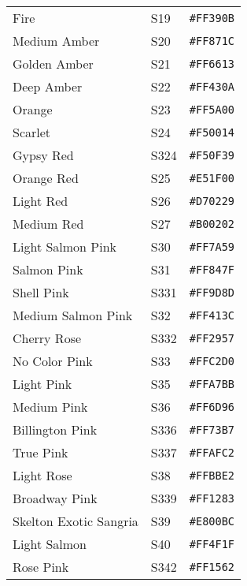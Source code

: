 \documentclass[a4paper]{article}
\begin{document}
\begin{longtable}{|l|l|r|}
Fire & S19 & \texttt{\#FF390B} \cellcolor[HTML]{FF390B} \\
Medium Amber & S20 & \texttt{\#FF871C} \cellcolor[HTML]{FF871C} \\
Golden Amber & S21 & \texttt{\#FF6613} \cellcolor[HTML]{FF6613} \\
Deep Amber & S22 & \texttt{\#FF430A} \cellcolor[HTML]{FF430A} \\
Orange & S23 & \texttt{\#FF5A00} \cellcolor[HTML]{FF5A00} \\
Scarlet & S24 & \texttt{\#F50014} \cellcolor[HTML]{F50014} \\
Gypsy Red & S324 & \texttt{\#F50F39} \cellcolor[HTML]{F50F39} \\
Orange Red & S25 & \texttt{\#E51F00} \cellcolor[HTML]{E51F00} \\
Light Red & S26 & \texttt{\#D70229} \cellcolor[HTML]{D70229} \\
Medium Red & S27 & \texttt{\#B00202} \cellcolor[HTML]{B00202} \\
Light Salmon Pink & S30 & \texttt{\#FF7A59} \cellcolor[HTML]{FF7A59} \\
Salmon Pink & S31 & \texttt{\#FF847F} \cellcolor[HTML]{FF847F} \\
Shell Pink & S331 & \texttt{\#FF9D8D} \cellcolor[HTML]{FF9D8D} \\
Medium Salmon Pink & S32 & \texttt{\#FF413C} \cellcolor[HTML]{FF413C} \\
Cherry Rose & S332 & \texttt{\#FF2957} \cellcolor[HTML]{FF2957} \\
No Color Pink & S33 & \texttt{\#FFC2D0} \cellcolor[HTML]{FFC2D0} \\
Light Pink & S35 & \texttt{\#FFA7BB} \cellcolor[HTML]{FFA7BB} \\
Medium Pink & S36 & \texttt{\#FF6D96} \cellcolor[HTML]{FF6D96} \\
Billington Pink & S336 & \texttt{\#FF73B7} \cellcolor[HTML]{FF73B7} \\
True Pink & S337 & \texttt{\#FFAFC2} \cellcolor[HTML]{FFAFC2} \\
Light Rose & S38 & \texttt{\#FFBBE2} \cellcolor[HTML]{FFBBE2} \\
Broadway Pink & S339 & \texttt{\#FF1283} \cellcolor[HTML]{FF1283} \\
Skelton Exotic Sangria & S39 & \texttt{\#E800BC} \cellcolor[HTML]{E800BC} \\
Light Salmon & S40 & \texttt{\#FF4F1F} \cellcolor[HTML]{FF4F1F} \\
Rose Pink & S342 & \texttt{\#FF1562} \cellcolor[HTML]{FF1562} \\

\end{longtable}
\end{document}
